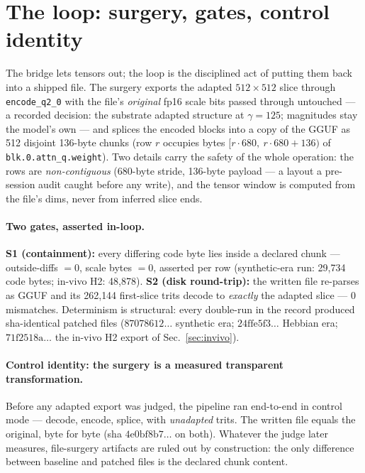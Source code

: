 \section{The loop: surgery, gates, control identity}
\label{sec:loop}

The bridge lets tensors out; the loop is the disciplined act of
putting them back into a shipped file. The surgery exports the
adapted $512\times512$ slice through \texttt{encode\_q2\_0} with the
file's \emph{original} fp16 scale bits passed through untouched --- a
recorded decision: the substrate adapted structure at $\gamma=125$;
magnitudes stay the model's own --- and splices the encoded blocks
into a copy of the GGUF as 512 disjoint 136-byte chunks (row $r$
occupies bytes $[r\cdot 680,\ r\cdot 680 + 136)$ of
\texttt{blk.0.attn\_q.weight}). Two details carry the safety of the
whole operation: the rows are \emph{non-contiguous} (680-byte stride,
136-byte payload --- a layout a pre-session audit caught before any
write), and the tensor window is computed from the file's dims, never
from inferred slice ends.

\paragraph{Two gates, asserted in-loop.}
\textbf{S1 (containment):} every differing code byte lies inside a
declared chunk --- outside-diffs $= 0$, scale bytes $= 0$, asserted
per row (synthetic-era run: 29,734 code bytes; in-vivo H2: 48,878).
\textbf{S2 (disk round-trip):} the written file re-parses as GGUF and
its 262{,}144 first-slice trits decode to \emph{exactly} the adapted
slice --- 0 mismatches. Determinism is structural: every double-run
in the record produced sha-identical patched files
($87078612\ldots$ synthetic era; $24\mathrm{ffe}5\mathrm{f}3\ldots$
Hebbian era; $71\mathrm{f}2518\mathrm{a}\ldots$ the in-vivo H2 export
of Sec.~\ref{sec:invivo}).

\paragraph{Control identity: the surgery is a measured transparent
transformation.}
Before any adapted export was judged, the pipeline ran end-to-end in
control mode --- decode, encode, splice, with \emph{unadapted} trits.
The written file equals the original, byte for byte (sha
$4\mathrm{e}0\mathrm{bf}8\mathrm{b}7\ldots$ on both). Whatever the
judge later measures, file-surgery artifacts are ruled out by
construction: the only difference between baseline and patched files
is the declared chunk content.

